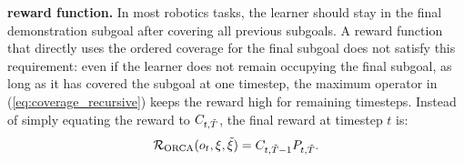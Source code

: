 \textbf{\ours{} reward function.}
In most robotics tasks, the learner should stay in the final demonstration subgoal after covering all previous subgoals. 
A reward function that directly uses the ordered coverage for the final subgoal does not satisfy this requirement: 
even if the learner does not remain occupying the final subgoal, as long as it has covered the subgoal at one timestep, the maximum operator in (\ref{eq:coverage_recursive}) keeps the reward high for remaining timesteps. 
Instead of simply equating the reward to $C_{t, \tilde{T}}$, the final \ours{} reward at timestep $t$ is:
\begin{equation}\label{eq:orca_reward}
    \mathcal{R}_\text{ORCA}(o_t, \xi, \tilde{\xi}) = C_{t, \tilde{T}-1}P_{t,\tilde{T}}.
\end{equation}









